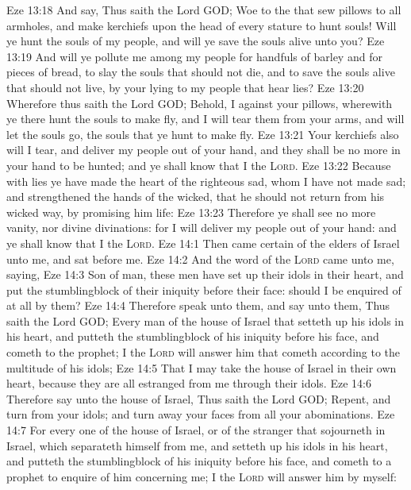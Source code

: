 \vs Eze 13:18 And say, Thus saith the Lord GOD; Woe to the  that sew pillows to all armholes, and make kerchiefs upon the head of every stature to hunt souls! Will ye hunt the souls of my people, and will ye save the souls alive  unto you?
\vs Eze 13:19 And will ye pollute me among my people for handfuls of barley and for pieces of bread, to slay the souls that should not die, and to save the souls alive that should not live, by your lying to my people that hear  lies?
\vs Eze 13:20 Wherefore thus saith the Lord GOD; Behold, I  against your pillows, wherewith ye there hunt the souls to make  fly, and I will tear them from your arms, and will let the souls go,  the souls that ye hunt to make  fly.
\vs Eze 13:21 Your kerchiefs also will I tear, and deliver my people out of your hand, and they shall be no more in your hand to be hunted; and ye shall know that I  the \textsc{Lord}.
\vs Eze 13:22 Because with lies ye have made the heart of the righteous sad, whom I have not made sad; and strengthened the hands of the wicked, that he should not return from his wicked way, by promising him life:
\vs Eze 13:23 Therefore ye shall see no more vanity, nor divine divinations: for I will deliver my people out of your hand: and ye shall know that I  the \textsc{Lord}.
\vs Eze 14:1 Then came certain of the elders of Israel unto me, and sat before me.
\vs Eze 14:2 And the word of the \textsc{Lord} came unto me, saying,
\vs Eze 14:3 Son of man, these men have set up their idols in their heart, and put the stumblingblock of their iniquity before their face: should I be enquired of at all by them?
\vs Eze 14:4 Therefore speak unto them, and say unto them, Thus saith the Lord GOD; Every man of the house of Israel that setteth up his idols in his heart, and putteth the stumblingblock of his iniquity before his face, and cometh to the prophet; I the \textsc{Lord} will answer him that cometh according to the multitude of his idols;
\vs Eze 14:5 That I may take the house of Israel in their own heart, because they are all estranged from me through their idols.
\vs Eze 14:6 Therefore say unto the house of Israel, Thus saith the Lord GOD; Repent, and turn  from your idols; and turn away your faces from all your abominations.
\vs Eze 14:7 For every one of the house of Israel, or of the stranger that sojourneth in Israel, which separateth himself from me, and setteth up his idols in his heart, and putteth the stumblingblock of his iniquity before his face, and cometh to a prophet to enquire of him concerning me; I the \textsc{Lord} will answer him by myself:
